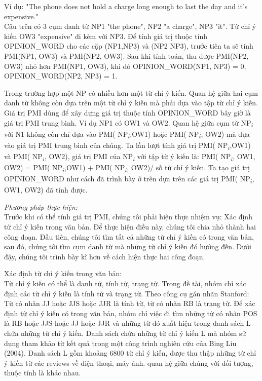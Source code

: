 \documentclass[12pt]{report}
\begin{document}
				\par Ví dụ: "The phone does not hold a charge long enough to last the day and it’s expensive."
				\\Câu trên có 3 cụm danh từ NP1 "the phone", NP2 "a charge", NP3 "it". Từ chỉ ý kiến OW3 "expensive" đi kèm với NP3. Để tính giá trị thuộc tính OPINION\_WORD cho các cặp (NP1,NP3) và (NP2 NP3), trước tiên ta sẽ tính PMI(NP1, OW3) và PMI(NP2, OW3). Sau khi tính toán, thu được PMI(NP2, OW3) nhỏ hơn PMI(NP1, OW3), khi đó OPINION\_WORD(NP1, NP3) = 0, OPINION\_WORD(NP2, NP3) = 1.
				\par Trong trường hợp một NP có nhiều hơn một từ chỉ ý kiến. Quan hệ giữa hai cụm danh từ không còn dựa trên một từ chỉ ý kiến mà phải dựa vào tập từ chỉ ý kiến. Giá trị PMI dùng để xây dựng giá trị thuộc tính OPINION\_WORD bây giờ là giá trị PMI trung bình. Ví dụ NP1 có OW1 và OW2. Quan hệ giữa cụm từ  NP\textsubscript{$i$} với N1 không còn chỉ dựa vào PMI( NP\textsubscript{$i$},OW1) hoặc PMI( NP\textsubscript{$i$}, OW2) mà dựa vào giá trị PMI trung bình của chúng. Ta lần lượt tính giá trị PMI( NP\textsubscript{$i$},OW1) và PMI( NP\textsubscript{$i$}, OW2), giá trị PMI của  NP\textsubscript{$i$} với tập từ ý kiến là:
				PMI( NP\textsubscript{$i$}, {OW1, OW2}) = PMI( NP\textsubscript{$i$},OW1) + PMI( NP\textsubscript{$i$}, OW2)/ số từ chỉ ý kiến. 
				Ta tạo giá trị OPINION\_WORD như cách đã trình bày ở trên dựa trên các giá trị PMI( NP\textsubscript{$i$}, {OW1, OW2}) đã tính được.
				\par \textit{Phương pháp thực hiện:}
				\\Trước khi có thể tính giá trị PMI, chúng tôi phải hiện thực nhiệm vụ: Xác định từ chỉ ý kiến trong văn bản. Để thực hiện điều này, chúng tôi chia nhỏ thành hai công đoạn. Đầu tiên, chúng tôi tìm tất cả những từ chỉ ý kiến có trong văn bản, sau đó, chúng tôi tìm cụm danh từ mà những từ chỉ ý kiến đó hướng đến. Dưới đậy, chúng tôi trình bày kĩ hơn về cách hiện thực hai công đoạn.
				\par Xác định từ chỉ ý kiến trong văn bản:
				\\Từ chỉ ý kiến có thể là danh từ, tính từ, trạng từ. Trong đề tài, nhóm chỉ xác định các từ chỉ ý kiến là tính từ và trạng từ. Theo công cụ gán nhãn Stanford: Từ có nhãn JJ hoặc JJS hoặc JJR là tính từ, từ có nhãn RB là trạng từ. Để xác định từ chỉ ý kiến có trong văn bản, nhóm chỉ việc đi tìm những từ có nhãn POS là RB hoặc JJS hoặc JJ hoặc JJR và những từ đó xuất hiện trong danh sách L chứa những từ chỉ ý kiến. Danh sách chứa những từ chỉ ý kiến L mà nhóm sử dụng tham khảo từ kết quả trong một công trình nghiên cứu của Bing Liu (2004)\cite{findfeatures1}. Danh sách L gồm khoảng 6800 từ chỉ ý kiến, được thu thập những từ chỉ ý kiến từ các reviews về điện thoại, máy ảnh. quan hệ giữa chúng với đối tượng, thuộc tính là khác nhau. 
\end{document}
